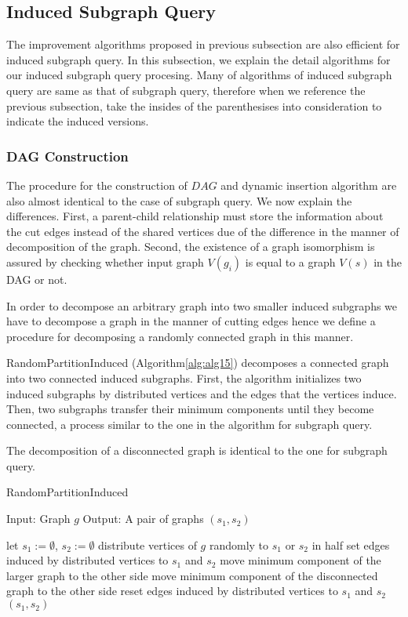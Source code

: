 \subsection{Induced Subgraph Query}
The improvement algorithms proposed in previous subsection are also efficient for induced subgraph query.
In this subsection, we explain the detail algorithms for our induced subgraph query procesing.
Many of algorithms of induced subgraph query are same as that of subgraph query, therefore when we reference the 
previous subsection, take the insides of the parenthesises into consideration to indicate the induced versions.

\subsubsection{DAG Construction}
The procedure for the construction of $DAG$ and dynamic insertion algorithm are also almost identical to the case of subgraph query.
We now explain the differences. First, a parent-child relationship must store the information about the cut edges instead of the 
shared vertices due of the difference in the manner of decomposition of the graph. Second, the existence of a graph isomorphism is 
assured by checking whether input graph $V(g_i)$ is equal to a graph $V(s)$ in the DAG or not.

In order to decompose an arbitrary graph into two smaller induced subgraphs we have to decompose a graph in the manner of cutting edges
hence we define a procedure for decomposing a randomly connected graph in this manner.

RandomPartitionInduced (Algorithm\ref{alg:alg15}) decomposes a connected graph into two connected induced subgraphs.
First, the algorithm initializes two induced subgraphs by distributed vertices and the edges that the vertices induce.
Then, two subgraphs transfer their minimum components until they become connected, a process similar to the one in the 
algorithm for subgraph query.

The decomposition of a disconnected graph is identical to the one for subgraph query.

\begin{algorithm}
\caption{RandomPartitionInduced}
\label{alg:alg15}
\begin{algorithmic}
\STATE Input: Graph $g$
\STATE Output: A pair of graphs $(s_1, s_2)$
\end{algorithmic}
\begin{algorithmic}[1]
\STATE let $s_1 := \emptyset$, $s_2 := \emptyset$
\STATE distribute vertices of $g$ randomly to $s_1$ or $s_2$ in half
\STATE set edges induced by distributed vertices to $s_1$ and $s_2$ 
\REPEAT
		\STATE move minimum component of the larger graph to the other side
	\ELSE
		\STATE move minimum component of the disconnected graph to the other side
	\ENDIF
	\STATE reset edges induced by distributed vertices to $s_1$ and $s_2$ 
\RETURN $(s_1,s_2)$
\end{algorithmic}
\end{algorithm}

